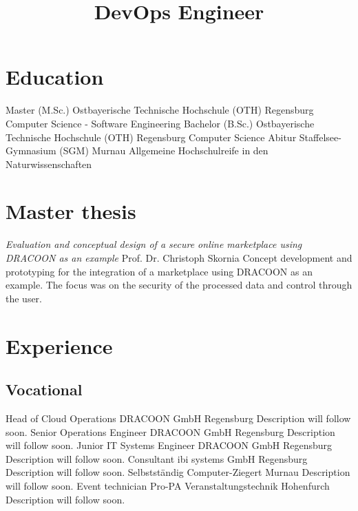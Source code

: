 \documentclass[11pt,a4paper,sans,final]{moderncv}
\title				{DevOps Engineer}
\begin{document}
	\makecvtitle
	
	\section{Education}
			{Master (M.Sc.)}	{Ostbayerische Technische Hochschule (OTH)}	{Regensburg}	{}	{Computer Science - Software Engineering}
			{Bachelor (B.Sc.)}	{Ostbayerische Technische Hochschule (OTH)}	{Regensburg}	{}	{Computer Science}
				{Abitur}			{Staffelsee-Gymnasium (SGM)}				{Murnau}		{}	{Allgemeine Hochschulreife in den Naturwissenschaften}
	
	\section{Master thesis}
					{\emph{Evaluation and conceptual design of a secure online marketplace using DRACOON as an example}}
			{Prof. Dr. Christoph Skornia}
			{Concept development and prototyping for the integration of a marketplace using DRACOON as an example. The focus was on the security of the processed data and control through the user.}
	
	\section{Experience}
	
		\subsection{Vocational}
				{Head of Cloud Operations}							{DRACOON GmbH}					{Regensburg}	{}	{Description will follow soon.}
				{Senior Operations Engineer}						{DRACOON GmbH}					{Regensburg}	{}	{Description will follow soon.}
					{Junior IT Systems Engineer}						{DRACOON GmbH}					{Regensburg}	{}	{Description will follow soon.}
				{Consultant}										{ibi systems GmbH}				{Regensburg}	{}	{Description will follow soon.}
				{Selbstständig}										{Computer-Ziegert}				{Murnau}		{}	{Description will follow soon.}
					{Event technician}									{Pro-PA Veranstaltungstechnik}	{Hohenfurch}	{}	{Description will follow soon.}
	
\end{document}
